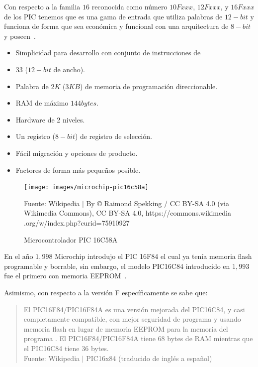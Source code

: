 \documentclass[conference]{IEEEtran}
\begin{document}
    Con respecto a la familia $16$ reconocida como número $10Fxxx$, $12Fxxx$,
    y $16Fxxx$ de los PIC tenemos que es una gama de entrada que utiliza
    palabras de $12-bit$ y funciona de forma que sea económica y funcional
    con una arquitectura de $8-bit$ y poseen~\cite{microchip-developer-help-2022}.

    \bigbreak

    \begin{itemize}
        \item Simplicidad para desarrollo con conjunto de instrucciones de
        \item $33$ ($12-bit$ de ancho).
        \item Palabra de $2K$ ($3KB$) de memoria de programación direccionable.
        \item RAM de máximo $144bytes$.
        \item Hardware de 2 niveles.
        \item Un registro ($8-bit$) de registro de selección.
        \item Fácil migración y opciones de producto.
        \item Factores de forma más pequeños posible.
    \end{itemize}

    \bigbreak

    \begin{figure}[H]
        \centering
        \texttt{[image: images/microchip-pic16c58a]}
        \caption{Microcontrolador PIC 16C58A} \footnotesize
        Fuente: Wikipedia $\mid$ By © Raimond Spekking / CC BY-SA 4.0 (via
        Wikimedia Commons), CC BY-SA 4.0, https://commons.wikimedia
        .org/w/index.php?curid=75910927 \cite{wikipedia-pic-2022}
    \end{figure}

    \bigbreak

    En el año $1,998$ Microchip introdujo el PIC 16F84 el cual ya tenía
    memoria flash programable y borrable, sin embargo, el modelo PIC16C84
    introducido en $1,993$ fue el primero con memoria EEPROM~\cite{wikipedia-pic-2022}.

    \bigbreak

    Asimismo, con respecto a la versión F específicamente se sabe que:

    \bigbreak

    \begin{quote}
        El PIC16F84/PIC16F84A es una versión mejorada del PIC16C84, y casi
        completamente compatible, con mejor seguridad de programa y usando
        memoria flash en lugar de memoria EEPROM para la memoria del programa
        . El PIC16F84/PIC16F84A tiene 68 bytes de RAM mientras que el
        PIC16C84 tiene 36 bytes.\\
        \small Fuente: Wikipedia $\mid$ PIC16x84 (traducido de inglés a
        español) \cite{wikipedia-pc16x84-2020}
    \end{quote}
\end{document}
